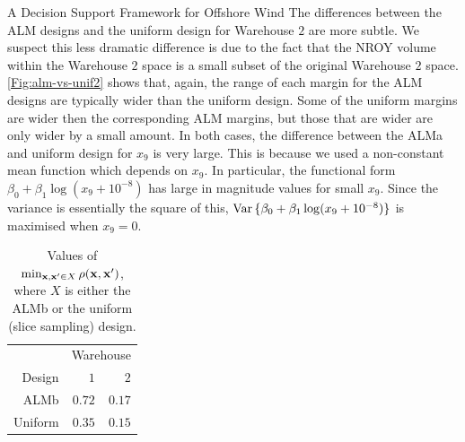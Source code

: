 \begin{chapter}{A Decision Support Framework for Offshore Wind \label{Ch:ds-for-ow}}
The differences between the ALM designs and the uniform design for Warehouse $2$ are more subtle. We suspect this less dramatic difference is due to the fact that the NROY volume within the Warehouse $2$ space is a small subset of the original Warehouse $2$ space. \cref{Fig:alm-vs-unif2} shows that, again, the range of each margin for the ALM designs are typically wider than the uniform design. Some of the uniform margins are wider then the corresponding ALM margins, but those that are wider are only wider by a small amount. In both cases, the difference between the ALMa and uniform design for $x_9$ is very large. This is because we used a non-constant mean function which depends on $x_9$. In particular, the functional form $\beta_0 + \beta_1 \log (x_9 + 10^{-8})$ has large in magnitude values for small $x_9$. Since the variance is essentially the square of this, $\mathrm{Var}\,\{\beta_0 + \beta_1 \log (x_9 + 10^{-8})\}$ is maximised when $x_9 = 0$.
\begin{table}
\centering
\begin{tabular}{rrr}
\toprule
  & \multicolumn{2}{c}{Warehouse} \\\cmidrule{2-3}
Design & $1$ & $2$ \\\cmidrule{1-3}
 ALMb & $0.72$ & $0.17$ \\
 Uniform & $0.35$ & $0.15$ \\\bottomrule
\end{tabular}
\caption{Values of $\min_{\mathbf{x}, \mathbf{x}' \in X} \rho (\mathbf{x}, \mathbf{x}')$, where $X$ is either the ALMb or the uniform (slice sampling) design. \label{Tab:min-distances}}
\end{table}


\end{chapter}
